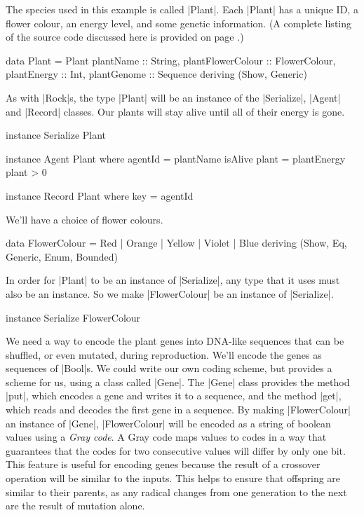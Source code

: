The species used in this example is called |Plant|.
Each |Plant| has a unique ID, a flower colour,
an energy level, and some genetic information.
(A complete listing of the source code discussed here is provided on 
page \pageref{code:plant}.)

\begin{code}
data Plant = Plant
  { 
    plantName :: String,
    plantFlowerColour :: FlowerColour,
    plantEnergy :: Int,
    plantGenome :: Sequence
  } deriving (Show, Generic)
\end{code} 

As with |Rock|s, the type |Plant| will be an instance of 
the |Serialize|, |Agent| and |Record| classes.
Our plants will stay alive until all of their energy is gone.

\begin{code}
instance Serialize Plant

instance Agent Plant where
  agentId = plantName
  isAlive plant = plantEnergy plant > 0

instance Record Plant where key = agentId
\end{code} 

We'll have a choice of flower colours.
\begin{code}
data FlowerColour = Red | Orange | Yellow | Violet | Blue
  deriving (Show, Eq, Generic, Enum, Bounded)
\end{code} 

In order for |Plant| to be an instance of |Serialize|,
any type that it uses must also be an instance.
So we make |FlowerColour| be an instance of |Serialize|.

\begin{code}
instance Serialize FlowerColour
\end{code} 

We need a way to encode the plant genes into DNA-like sequences that can
be shuffled, or even mutated, during reproduction.
We'll encode the genes as sequences of |Bool|s.
We could write our own coding scheme, but 
provides a scheme for us, using a class called |Gene|.
The |Gene| class provides the method |put|, which encodes a gene and writes it to a sequence,
and the method |get|, which reads and decodes the first gene in a sequence.
By making |FlowerColour| an instance of |Gene|, 
|FlowerColour| will be encoded as a string of boolean values using a \emph{Gray code}.
A Gray code maps values to codes in a way that guarantees that the codes
for two consecutive values will differ by only one bit. This feature
is useful for encoding genes because the result
of a crossover operation will be similar to the inputs. 
This helps to
ensure that offspring are similar to their parents, as any radical
changes from one generation to the next are the result of mutation
alone.


